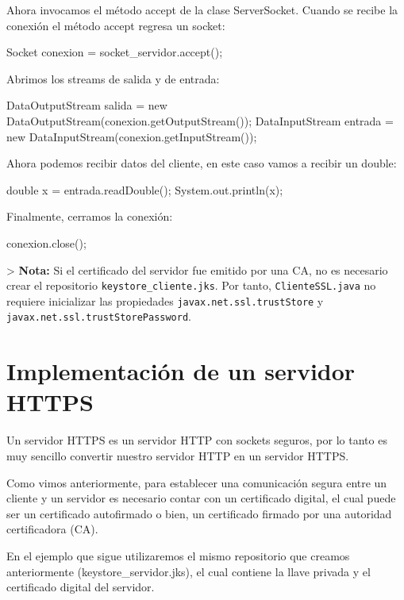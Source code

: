 \documentclass[11pt,a4paper,oneside]{book}
\begin{document}
Ahora invocamos el método accept de la clase ServerSocket. Cuando se recibe la conexión el método accept regresa un socket:

\begin{SourceCode}
Socket conexion = socket_servidor.accept();
\end{SourceCode}

Abrimos los streams de salida y de entrada:

\begin{SourceCode}
DataOutputStream salida = new DataOutputStream(conexion.getOutputStream());
DataInputStream entrada = new DataInputStream(conexion.getInputStream());
\end{SourceCode}

Ahora podemos recibir datos del cliente, en este caso vamos a recibir un double:

\begin{SourceCode}
double x = entrada.readDouble();
System.out.println(x);
\end{SourceCode}

Finalmente, cerramos la conexión:

\begin{SourceCode}
conexion.close();
\end{SourceCode}

> \textbf{Nota:} Si el certificado del servidor fue emitido por una CA, no es necesario crear el repositorio \texttt{keystore\_cliente.jks}. Por tanto, \texttt{ClienteSSL.java} no requiere inicializar las propiedades \texttt{javax.net.ssl.trustStore} y \texttt{javax.net.ssl.trustStorePassword}.

\section{Implementación de un servidor HTTPS}

Un servidor HTTPS es un servidor HTTP con sockets seguros, por lo tanto es muy sencillo convertir nuestro servidor HTTP en un servidor HTTPS.

Como vimos anteriormente, para establecer una comunicación segura entre un cliente y un servidor es necesario contar con un certificado digital, el cual puede ser un certificado autofirmado o bien, un certificado firmado por una autoridad certificadora (CA).

En el ejemplo que sigue utilizaremos el mismo repositorio que creamos anteriormente (keystore\_servidor.jks), el cual contiene la llave privada y el certificado digital del servidor.
\end{document}
